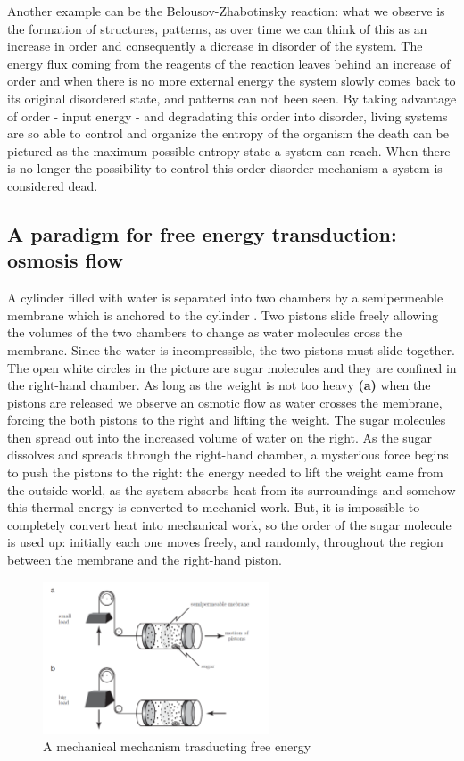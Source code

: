 \documentclass[../main/main.tex]{subfiles}
\begin{document}
Another example can be the Belousov-Zhabotinsky reaction: what we observe is the formation of structures, patterns, as over time we can think of this as an increase in order and consequently a dicrease in disorder of the system. The energy flux coming from the reagents of the reaction leaves behind an increase of order and when there is no more external energy the system slowly comes back to its original disordered state, and patterns can not been seen. 
By taking advantage of order - input energy - and degradating this order into disorder, living systems are so able to control and organize the entropy of the organism the death can be pictured as the maximum possible entropy state a system can reach. When there is no longer the possibility to control this order-disorder mechanism a system is considered dead.

\subsection{A paradigm for free energy transduction: osmosis flow}
A cylinder filled with water is separated into two chambers by a semipermeable membrane which is anchored to the cylinder \cite{biological_physics}. Two pistons slide freely allowing the volumes of the two chambers to change as water molecules cross the membrane. Since the water is incompressible, the two pistons must slide together. The open white circles in the picture are sugar molecules and they are confined in the right-hand chamber. 
As long as the weight is not too heavy \textbf{(a)} when the pistons are released we observe an osmotic flow as water crosses the membrane, forcing the both pistons to the right and lifting the weight. The sugar molecules then spread out into the increased volume of water on the right. 
As the sugar dissolves and spreads through the right-hand chamber, a mysterious force begins to push the pistons to the right: the energy needed to lift the weight came from the outside world, as the system absorbs heat from its surroundings and somehow this thermal energy is converted to mechanicl work. But, it is impossible to completely convert heat into mechanical work, so the order of the sugar molecule is used up: initially each one moves freely, and randomly, throughout the region
between the membrane and the right-hand piston. 

\begin{figure}[h!]
    \centering
    \includegraphics[width=0.6\textwidth]{../frontespizio/tikz/1_lesson/osmosis.PNG}
    \caption{A mechanical mechanism trasducting free energy}
\end{figure}
\end{document}
